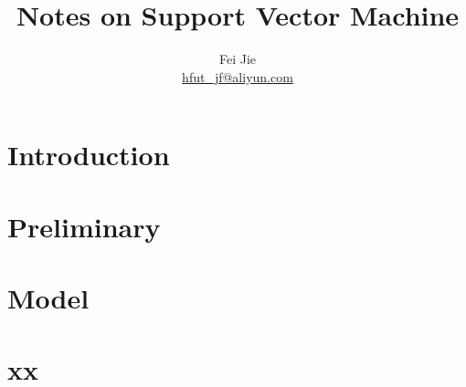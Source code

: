 \documentclass{article}
\title{Notes on Support Vector Machine}
\author{Fei Jie \\ \href{}{hfut\_jf@aliyun.com}}
\begin{document}
\maketitle
\thispagestyle{firstpage}

\section{Introduction}


\section{Preliminary}


\section{Model		}


\section{xx}




\end{document}
